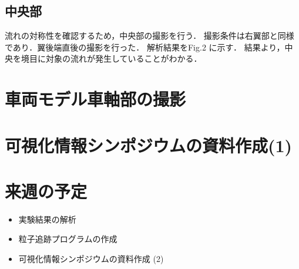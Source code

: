 \documentclass[twocolumn,a4j]{jsarticle}
\begin{document}
\subsection{中央部}
流れの対称性を確認するため，中央部の撮影を行う．
撮影条件は右翼部と同様であり．翼後端直後の撮影を行った．
解析結果をFig.2 に示す．
結果より，中央を境目に対象の流れが発生していることがわかる．

\section{車両モデル車軸部の撮影}
\section{可視化情報シンポジウムの資料作成(1)}

\section{来週の予定}
\begin{itemize}
  \item 実験結果の解析
  \item 粒子追跡プログラムの作成
  \item 可視化情報シンポジウムの資料作成 (2)
\end{itemize}
\end{document}
